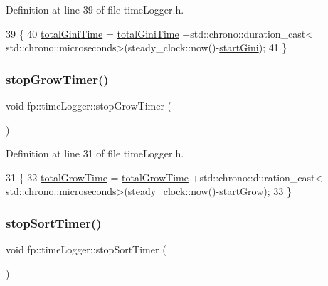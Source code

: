 Definition at line 39 of file time\+Logger.\+h.


\begin{DoxyCode}
39                                        \{
40                 \hyperlink{classfp_1_1timeLogger_a1f1c446894052c4df2100b501069a927}{totalGiniTime} = \hyperlink{classfp_1_1timeLogger_a1f1c446894052c4df2100b501069a927}{totalGiniTime} +std::chrono::duration\_cast<
      std::chrono::microseconds>(steady\_clock::now()-\hyperlink{classfp_1_1timeLogger_abe0bd7eeb79ad8c33747afb4f4a99e88}{startGini});
41             \}
\end{DoxyCode}
\mbox{\label{classfp_1_1timeLogger_a4ce75092aa7c974da223425e921312a6}} 
\subsubsection{\texorpdfstring{stop\+Grow\+Timer()}{stopGrowTimer()}}
{\footnotesize\ttfamily void fp\+::time\+Logger\+::stop\+Grow\+Timer (\begin{DoxyParamCaption}{ }\end{DoxyParamCaption})\hspace{0.3cm}{\ttfamily [inline]}}



Definition at line 31 of file time\+Logger.\+h.


\begin{DoxyCode}
31                                        \{
32                 \hyperlink{classfp_1_1timeLogger_ae79b7283b8f150e851fc325c29618ba1}{totalGrowTime} = \hyperlink{classfp_1_1timeLogger_ae79b7283b8f150e851fc325c29618ba1}{totalGrowTime} +std::chrono::duration\_cast<
      std::chrono::microseconds>(steady\_clock::now()-\hyperlink{classfp_1_1timeLogger_a530aa42af210e19fbab96c998271dbc4}{startGrow});
33             \}
\end{DoxyCode}
\mbox{\label{classfp_1_1timeLogger_a69923048ee4739b4da9581000775fd2a}} 
\subsubsection{\texorpdfstring{stop\+Sort\+Timer()}{stopSortTimer()}}
{\footnotesize\ttfamily void fp\+::time\+Logger\+::stop\+Sort\+Timer (\begin{DoxyParamCaption}{ }\end{DoxyParamCaption})\hspace{0.3cm}{\ttfamily [inline]}}



